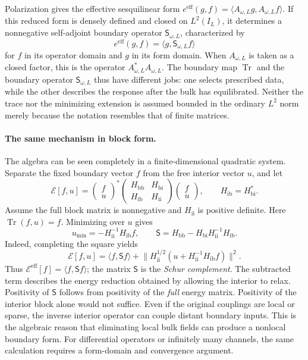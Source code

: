 Polarization gives the effective sesquilinear form
$e^{\mathrm{eff}}(g,f)
=\langle A_{\omega,L}g,A_{\omega,L}f\rangle$.
If this reduced form is densely defined and closed on $L^2(I_L)$,
it determines a nonnegative self-adjoint boundary operator
$\mathsf S_{\omega,L}$, characterized by
\[
e^{\mathrm{eff}}(g,f)
=\langle g,\mathsf S_{\omega,L}f\rangle
\]
for $f$ in its operator domain and $g$ in its form domain.
When $A_{\omega,L}$ is taken as a closed factor, this is the
operator $A_{\omega,L}^*A_{\omega,L}$. The boundary map
$\operatorname{Tr}$ and the boundary operator $\mathsf S_{\omega,L}$
thus have different jobs: one selects prescribed data, while the
other describes the response after the bulk has equilibrated.
Neither the trace nor the minimizing extension is assumed bounded
in the ordinary $L^2$ norm merely because the notation resembles
that of finite matrices.

\paragraph{The same mechanism in block form.}
The algebra can be seen completely in a finite-dimensional
quadratic system. Separate the fixed boundary vector $f$ from
the free interior vector $u$, and let
\[
\mathcal E[f,u]
=
\begin{pmatrix}f\\u\end{pmatrix}^{\!*}
\begin{pmatrix}
H_{\mathrm{bb}}&H_{\mathrm{bi}}\\
H_{\mathrm{ib}}&H_{\mathrm{ii}}
\end{pmatrix}
\begin{pmatrix}f\\u\end{pmatrix},
\qquad H_{\mathrm{ib}}=H_{\mathrm{bi}}^*.
\]
Assume the full block matrix is nonnegative and
$H_{\mathrm{ii}}$ is positive definite. Here
$\operatorname{Tr}(f,u)=f$. Minimizing over $u$ gives
\[
u_{\min}=-H_{\mathrm{ii}}^{-1}H_{\mathrm{ib}}f,\qquad
\mathsf S=H_{\mathrm{bb}}
-H_{\mathrm{bi}}H_{\mathrm{ii}}^{-1}H_{\mathrm{ib}}.
\]
Indeed, completing the square yields
\[
\mathcal E[f,u]
=\langle f,\mathsf S f\rangle
+\bigl\lVert H_{\mathrm{ii}}^{1/2}
  (u+H_{\mathrm{ii}}^{-1}H_{\mathrm{ib}}f)\bigr\rVert^2.
\]
Thus $\mathcal E^{\mathrm{eff}}[f]=\langle f,\mathsf S f\rangle$;
the matrix $\mathsf S$ is the \emph{Schur complement}.
The subtracted term describes the energy reduction obtained by
allowing the interior to relax. Positivity of $\mathsf S$ follows
from positivity of the \emph{full} energy matrix. Positivity of the
interior block alone would not suffice. Even if the original
couplings are local or sparse, the inverse interior operator can
couple distant boundary inputs. This is the algebraic reason that
eliminating local bulk fields can produce a nonlocal boundary form.
For differential operators or infinitely many channels, the same
calculation requires a form-domain and convergence argument.

